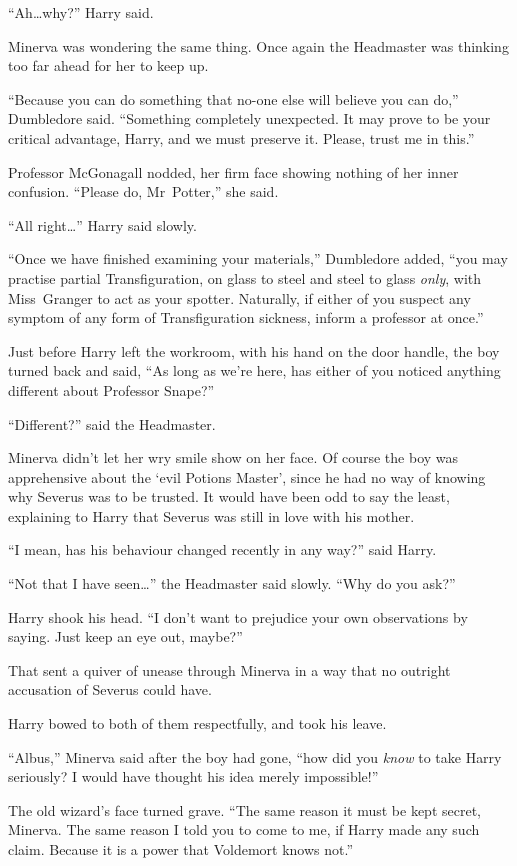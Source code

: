 “Ah…why?” Harry said.

Minerva was wondering the same thing. Once again the Headmaster was thinking too far ahead for her to keep up.

“Because you can do something that no-one else will believe you can do,” Dumbledore said. “Something completely unexpected. It may prove to be your critical advantage, Harry, and we must preserve it. Please, trust me in this.”

Professor McGonagall nodded, her firm face showing nothing of her inner confusion. “Please do, Mr~Potter,” she said.

“All right…” Harry said slowly.

“Once we have finished examining your materials,” Dumbledore added, “you may practise partial Transfiguration, on glass to steel and steel to glass \emph{only}, with Miss~Granger to act as your spotter. Naturally, if either of you suspect any symptom of any form of Transfiguration sickness, inform a professor at once.”

Just before Harry left the workroom, with his hand on the door handle, the boy turned back and said, “As long as we’re here, has either of you noticed anything different about Professor Snape?”

“Different?” said the Headmaster.

Minerva didn’t let her wry smile show on her face. Of course the boy was apprehensive about the ‘evil Potions Master’, since he had no way of knowing why Severus was to be trusted. It would have been odd to say the least, explaining to Harry that Severus was still in love with his mother.

“I mean, has his behaviour changed recently in any way?” said Harry.

“Not that I have seen…” the Headmaster said slowly. “Why do you ask?”

Harry shook his head. “I don’t want to prejudice your own observations by saying. Just keep an eye out, maybe?”

That sent a quiver of unease through Minerva in a way that no outright accusation of Severus could have.

Harry bowed to both of them respectfully, and took his leave.

\later

“Albus,” Minerva said after the boy had gone, “how did you \emph{know} to take Harry seriously? I would have thought his idea merely impossible!”

The old wizard’s face turned grave. “The same reason it must be kept secret, Minerva. The same reason I told you to come to me, if Harry made any such claim. Because it is a power that Voldemort knows not.”

